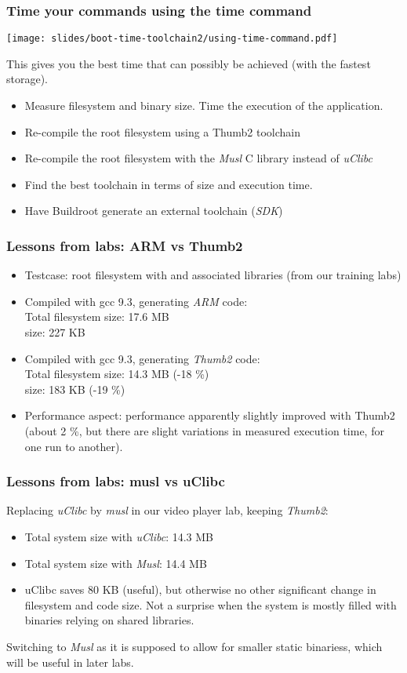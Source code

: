 \begin{frame}
\frametitle{Time your commands using the time command}
\begin{center}
\texttt{[image: slides/boot-time-toolchain2/using-time-command.pdf]}
\end{center}
This gives you the best time that can possibly be achieved (with the fastest storage).
\end{frame}

{
\begin{itemize}
\item Measure filesystem and  binary size. Time
      the execution of the application.
\item Re-compile the root filesystem using a Thumb2 toolchain
\item Re-compile the root filesystem with the {\em Musl}
      C library instead of {\em uClibc}
\item Find the best toolchain in terms of size and execution time.
\item Have Buildroot generate an external toolchain ({\em SDK})
\end{itemize}
}


\begin{frame}
\frametitle{Lessons from labs: ARM vs Thumb2}
\begin{itemize}
\item Testcase: root filesystem with  and associated
      libraries (from our training labs)
\item Compiled with gcc 9.3, generating {\em ARM} code:\\
      Total filesystem size: 17.6 MB\\
       size: 227 KB
\item Compiled with gcc 9.3, generating {\em Thumb2} code:\\
      Total filesystem size: 14.3 MB (-18 \%)\\
       size: 183 KB (-19 \%)
\item Performance aspect: performance apparently slightly improved with Thumb2
      (about 2 \%, but there are slight variations in measured
      execution time, for one run to another).
\end{itemize}
\end{frame}

\begin{frame}
\frametitle{Lessons from labs: musl vs uClibc}
Replacing {\em uClibc} by {\em musl} in our video player lab, keeping
{\em Thumb2}:
\begin{itemize}
   \item Total system size with {\em uClibc}: 14.3 MB
   \item Total system size with {\em Musl}: 14.4 MB
   \item uClibc saves 80 KB (useful), but otherwise no other significant change
    in filesystem and code size. Not a surprise when the system is mostly filled
    with binaries relying on shared libraries.
\end{itemize}
Switching to {\em Musl} as it is supposed to allow for smaller static
binariess, which will be useful in later labs.
\end{frame}
